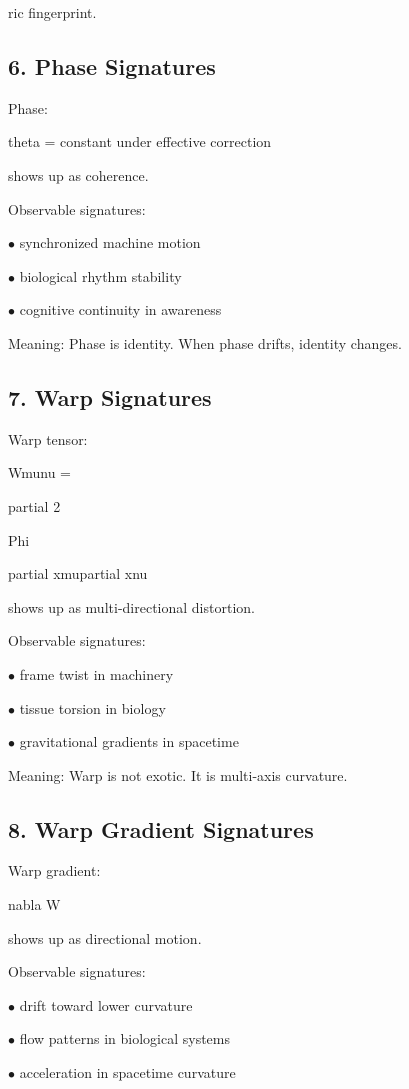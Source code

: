 \documentclass[10pt]{article}
\begin{document}
ric fingerprint.

\subsection*{6. Phase Signatures}
Phase:

theta = constant under effective correction

shows up as coherence.

Observable signatures:

\noindent $\bullet$ synchronized machine motion

\noindent $\bullet$ biological rhythm stability

\noindent $\bullet$ cognitive continuity in awareness

Meaning: Phase is identity. When phase drifts, identity changes.

\subsection*{7. Warp Signatures}
Warp tensor:

Wmunu =

partial 2

Phi

partial xmupartial xnu

shows up as multi-directional distortion.

Observable signatures:


\noindent $\bullet$ frame twist in machinery

\noindent $\bullet$ tissue torsion in biology

\noindent $\bullet$ gravitational gradients in spacetime

Meaning: Warp is not exotic. It is multi-axis curvature.

\subsection*{8. Warp Gradient Signatures}
Warp gradient:

nabla W

shows up as directional motion.

Observable signatures:

\noindent $\bullet$ drift toward lower curvature

\noindent $\bullet$ flow patterns in biological systems

\noindent $\bullet$ acceleration in spacetime curvature
\end{document}

